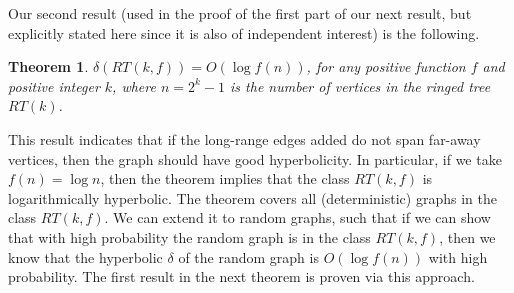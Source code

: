 \documentclass[11pt]{article}
\newtheorem{thm}{Theorem}
\begin{document}
Our second result 
(used in the proof of the first part of our next result, but explicitly 
stated here since it is also of independent interest) 
is the following.

\begin{thm}\label{thm:random-ringed-tree-delta}
$\delta(RT(k,f)) = O(\log f(n))$, for any positive function $f$ and positive 
	integer $k$, where $n=2^{k}-1$ is the number of
	vertices in the ringed tree $RT(k)$.
\end{thm}

\noindent
This result 
indicates that if the long-range edges added do not
	span far-away vertices, then the graph should have good hyperbolicity.
In particular, if we take $f(n)=\log n$, then the theorem implies that
	the class $RT(k,f)$ is logarithmically hyperbolic.
The theorem covers all (deterministic) graphs in the class $RT(k,f)$.
We can extend it to random graphs, such that if we can show that 
	with high probability the random graph is in the class $RT(k,f)$, then
	we know that the hyperbolic $\delta$ of the random graph is
	$O(\log f(n))$ with high probability.
The first result in the next theorem is proven via this approach.



\end{document}
